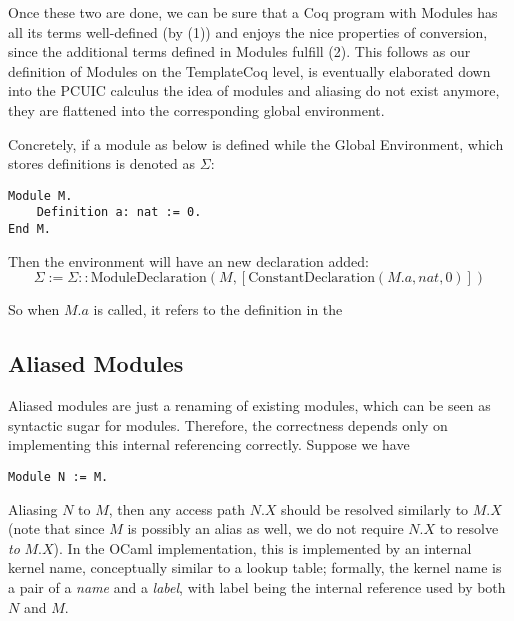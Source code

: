 Once these two are done, we can be sure that a Coq program with Modules
has all its terms well-defined (by (1)) and enjoys the nice properties of
conversion, since the additional terms defined in Modules fulfill (2).
This follows as our definition of Modules on the TemplateCoq level, is
eventually elaborated down into the PCUIC calculus the idea of modules and
aliasing do not exist anymore, they are flattened into the corresponding global
environment.

Concretely, if a module as below is defined while the Global Environment, which
stores definitions is denoted as $\Sigma$:
\begin{verbatim}
Module M.
    Definition a: nat := 0.
End M.
\end{verbatim}
Then the environment will have an new declaration added:
\[\Sigma := \Sigma :: \text{ModuleDeclaration}(M,
[\text{ConstantDeclaration}(M.a, nat, 0)])\]

So when $M.a$ is called, it refers to the definition in the 

\subsection{Aliased Modules}
Aliased modules are just a renaming of existing modules, which can be seen as
syntactic sugar for modules. Therefore, the correctness depends only on
implementing this internal referencing correctly. Suppose we have

\begin{verbatim}
Module N := M.
\end{verbatim}

Aliasing $N$ to $M$, then any access path $N.X$ should be resolved similarly to
$M.X$ (note that since $M$ is possibly an alias as well, we do not require $N.X$
to resolve \emph{to} $M.X$). In the OCaml implementation, this is implemented 
by an internal kernel name, conceptually similar to a lookup table; formally,
the kernel name is a pair of a \emph{name} and a \emph{label}, with label being
the internal reference used by both $N$ and $M$.
